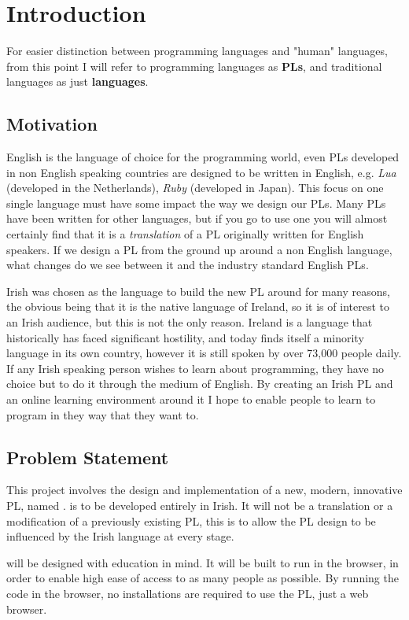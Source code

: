\chapter{Introduction}
For easier distinction between programming languages and "human" languages, from this point I will refer to programming languages as \textbf{PLs}, and traditional languages as just \textbf{languages}.
\section{Motivation}
English is the language of choice for the programming world, even PLs developed in non English speaking countries are designed to be written in English, e.g. \emph{Lua} (developed in the Netherlands), \emph{Ruby} (developed in Japan). This focus on one single language must have some impact the way we design our PLs. Many PLs have been written for other languages, but if you go to use one you will almost certainly find that it is a \emph{translation} of a PL originally written for English speakers\cite{wikipllist}. If we design a PL from the ground up around a non English language, what changes do we see between it and the industry standard English PLs.

Irish was chosen as the language to build the new PL around for many reasons, the obvious being that it is the native language of Ireland, so it is of interest to an Irish audience, but this is not the only reason. Ireland is a language that historically has faced significant hostility, and today finds itself a minority language in its own country, however it is still spoken by over 73,000 people daily\cite{csoirish}. If any Irish speaking person wishes to learn about programming, they have no choice but to do it through the medium of English. By creating an Irish PL and an online learning environment around it I hope to enable people to learn to program in they way that they want to.

\section{Problem Statement}
This project involves the design and implementation of a new, modern, innovative PL, named \Setanta{}. \Setanta{} is to be developed entirely in Irish. It will not be a translation or a modification of a previously existing PL, this is to allow the PL design to be influenced by the Irish language at every stage.

\Setanta{} will be designed with education in mind. It will be built to run in the browser, in order to enable high ease of access to as many people as possible. By running the code in the browser, no installations are required to use the PL, just a web browser.

